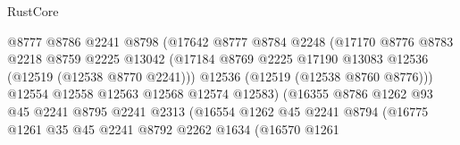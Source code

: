 \begin{lexlean}{RustCore}
\begin{coremodule}
                                      @8777
                                      @8786
                                      @2241
                                      @8798
                                      (@17642
                                        @8777
                                        @8784
                                        @2248
                                        (@17170
                                          @8776
                                          @8783
                                          @2218
                                          @8759
                                          @2225
                                          @13042
                                          (@17184
                                            @8769
                                            @2225
                                            @17190
                                            @13083
                                            @12536
                                            (@12519 (@12538 @8770 @2241)))
                                          @12536
                                          (@12519 (@12538 @8760 @8776)))
                                        @12554
                                        @12558
                                        @12563
                                        @12568
                                        @12574
                                        @12583)
                                      (@16355
                                        @8786
                                        @1262
                                        @93
                                        @45
                                        @2241
                                        @8795
                                        @2241
                                        @2313
                                        (@16554
                                          @1262
                                          @45
                                          @2241
                                          @8794
                                          (@16775
                                            @1261
                                            @35
                                            @45
                                            @2241
                                            @8792
                                            @2262
                                            @1634
                                            (@16570
                                              @1261

\end{coremodule}
\end{lexlean}
